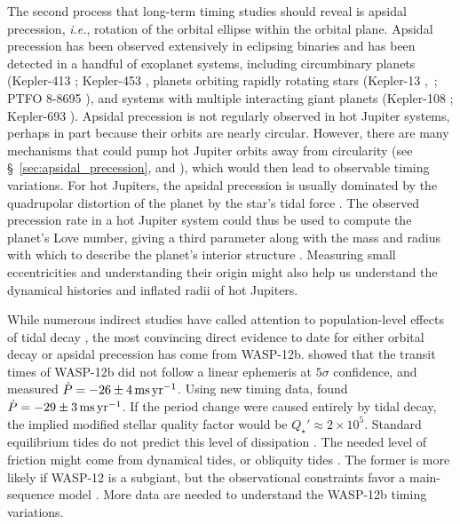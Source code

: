 \documentclass[12pt,twocolumn,tighten]{aastex62}
\begin{document}
The second process that long-term timing studies should reveal is
apsidal precession, {\it i.e.}, rotation of the orbital ellipse within
the orbital plane. Apsidal precession has been observed extensively in
eclipsing binaries \citep[{\it e.g.},][]{
  schwarzschild_structure_1958,torres_accurate_2010,borkovits_eclipse_2015}
and has been detected in a handful of exoplanet systems, including
circumbinary planets (Kepler-413 \citealt{kostov_kepler-413b_2014};
Kepler-453 \citealt{welsh_kepler_2015}, planets orbiting rapidly
rotating stars (Kepler-13
\citealt{szabo_spin-orbit_2012,szabo_mapping_2014},~\citealt{masuda_spin-orbit_2015};
PTFO 8-8695 \citealt{barnes_measurement_2013}), and systems with
multiple interacting giant planets (Kepler-108
\citealt{mills_kepler-108_2017}; Kepler-693
\citealt{masuda_eccentric_2017}).  Apsidal precession is not regularly
observed in hot Jupiter systems, perhaps in part because their orbits
are nearly circular.  However, there are many mechanisms that could
pump hot Jupiter orbits away from circularity (see
\S~\ref{sec:apsidal_precession}, and
\citealt{bailey_understanding_2019}), which would then lead to
observable timing variations.  For hot Jupiters, the apsidal
precession is usually dominated by the quadrupolar distortion of the
planet by the star's tidal force \citep{ragozzine_probing_2009}.  The
observed precession rate in a hot Jupiter system could thus be used to
compute the planet's Love number, giving a third parameter along with
the mass and radius with which to describe the planet's interior
structure \citep[{\it e.g.},][who performed a similar procedure for
HAT-P-13b]{batygin_determination_2009}.  Measuring small
eccentricities and understanding their origin might also help us
understand the dynamical histories and inflated radii of hot Jupiters.
\citep[{\it
e.g.},][respectively]{dawson_origins_2018,ibgui_tidal_2010}

While numerous indirect studies have called attention to
population-level effects of tidal decay
\citep{jackson_observational_2009,hansen_calibration_2010,penev_constraining_2012,husnoo_observational_2012,matsakos_origin_2016,cameron_hierarchical_2018,penev_empirical_2018},
the most convincing direct evidence to date for either orbital decay
or apsidal precession has come from WASP-12b.
\citet{maciejewski_departure_2016} showed that the transit times of
WASP-12b did not follow a linear ephemeris at $5\sigma$ confidence,
and measured $\dot{P} = -26 \pm 4\,{\rm ms}\,{\rm yr}^{-1}$.  Using
new timing data, \citet{patra_2017} found $\dot{P} = -29 \pm 3\,{\rm
ms}\,{\rm yr}^{-1}$.  If the period change were caused entirely by
tidal decay, the implied modified stellar quality factor would be
$Q_\star' \approx 2\times10^5$.  Standard equilibrium tides do not
predict this level of dissipation
\citep{penev_tidal_2011,ogilvie_tidal_2014}.  The needed level of
friction might come from dynamical tides, or obliquity tides
\citep{weinberg_tidal_2017,millholland_obliquity_2018}.  The former is
more likely if WASP-12 is a subgiant, but the observational
constraints favor a main-sequence model
\citep{bailey_understanding_2019}.  More data are needed to understand
the WASP-12b timing variations.
\end{document}
